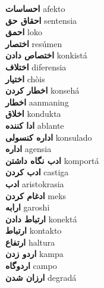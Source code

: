 \textbf{ احساسات  } afekto \\
\textbf{ احقاق حق  } sentensia \\
\textbf{ احمق  } loko \\
\textbf{ اختصار  } resúmen \\
\textbf{ اختصاص دادن  } konkistá \\
\textbf{ اختلاف  } diferensia \\
\textbf{ اختیار  } chòis \\
\textbf{ اخطار کردن  } konsehá \\
\textbf{ اخطار  } aanmaning \\
\textbf{ اخلاق  } kondukta \\
\textbf{ ادا کننده  } ablante \\
\textbf{ اداره کنسولی  } konsulado \\
\textbf{ اداره  } agensia \\
\textbf{ ادب نگاه داشتن  } komportá \\
\textbf{ ادب کردن  } castiga \\
\textbf{ ادب  } aristokrasia \\
\textbf{ ادغام کردن  } meks \\
\textbf{ ارابه  } garoshi \\
\textbf{ ارتباط دادن  } konektá \\
\textbf{ ارتباط  } kontakto \\
\textbf{ ارتفاع  } haltura \\
\textbf{ اردو زدن  } kampa \\
\textbf{ اردوگاه  } campo \\
\textbf{ ارزان شدن  } degradá \\
